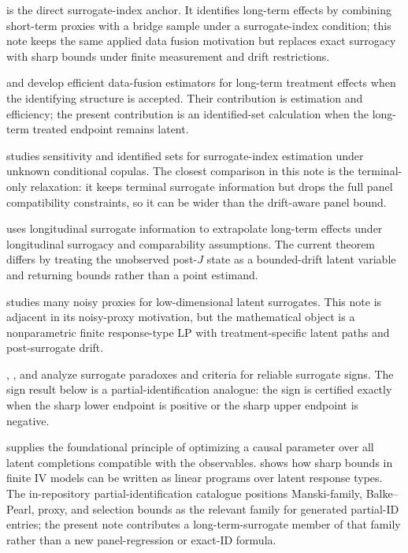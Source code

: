 \documentclass[11pt]{article}
\theoremstyle{definition}
\theoremstyle{plain}
\theoremstyle{remark}
\begin{document}
\cite{AtheyChettyImbensKang2019} is the direct surrogate-index anchor.  It identifies long-term effects by combining short-term proxies with a bridge sample under a surrogate-index condition; this note keeps the same applied data fusion motivation but replaces exact surrogacy with sharp bounds under finite measurement and drift restrictions.

\cite{ChenRitzwoller2023} and \cite{LiLuedtke2023} develop efficient data-fusion estimators for long-term treatment effects when the identifying structure is accepted.  Their contribution is estimation and efficiency; the present contribution is an identified-set calculation when the long-term treated endpoint remains latent.

\cite{FanManzanaresParkQi2026} studies sensitivity and identified sets for surrogate-index estimation under unknown conditional copulas.  The closest comparison in this note is the terminal-only relaxation: it keeps terminal surrogate information but drops the full panel compatibility constraints, so it can be wider than the drift-aware panel bound.

\cite{HuangWangYuanZhaoZhang2026} uses longitudinal surrogate information to extrapolate long-term effects under longitudinal surrogacy and comparability assumptions.  The current theorem differs by treating the unobserved post-\(J\) state as a bounded-drift latent variable and returning bounds rather than a point estimand.

\cite{LalImbensHull2026} studies many noisy proxies for low-dimensional latent surrogates.  This note is adjacent in its noisy-proxy motivation, but the mathematical object is a nonparametric finite response-type LP with treatment-specific latent paths and post-surrogate drift.

\cite{ChenGengJia2007}, \cite{VanderWeele2013}, and \cite{MaYinLiuGeng2021} analyze surrogate paradoxes and criteria for reliable surrogate signs.  The sign result below is a partial-identification analogue: the sign is certified exactly when the sharp lower endpoint is positive or the sharp upper endpoint is negative.

\cite{Manski1990} supplies the foundational principle of optimizing a causal parameter over all latent completions compatible with the observables.  \cite{BalkePearl1997} shows how sharp bounds in finite IV models can be written as linear programs over latent response types.  The in-repository partial-identification catalogue positions Manski-family, Balke--Pearl, proxy, and selection bounds as the relevant family for generated partial-ID entries; the present note contributes a long-term-surrogate member of that family rather than a new panel-regression or exact-ID formula.
\end{document}
